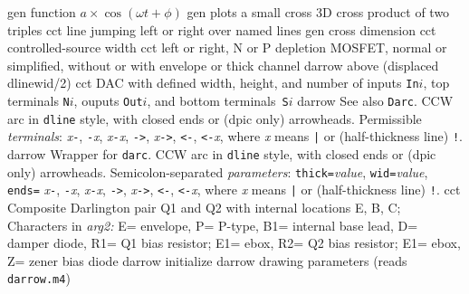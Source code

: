   {gen}
  {function $a\times\cos(\omega t + \phi)$ }
  {gen}
  {plots a small cross}
  {3D}
  {cross product of two triples}
  {cct}
  {line jumping left or right over named lines}
  {gen}
  {cross dimension}
  {cct}
  {controlled-source width}
  {cct}
  {left or right, N or P depletion MOSFET, normal or simplified,
    without or with envelope or thick channel
    }
  {darrow}
  {above (displaced dlinewid/2)}
  {cct}
  {DAC with defined width, height, and number of inputs {\tt In$i$},
    top terminals {\tt N$i$}, ouputs {\tt Out$i$},
    and bottom terminals~{\tt S$i$} }
  {darrow}
  {See also {\tt Darc}.
   CCW arc in {\tt dline} style, with closed ends or (dpic only) arrowheads.
  Permissible {\sl terminals}:
  {\sl x}{\tt -},
  {\tt -}{\sl x}, {\sl x}{\tt -}{\sl x}, {\tt ->}, {\sl x}{\tt ->},
  {\tt <-}, {\tt <-}{\sl x}, {\tt <->}
  where {\sl x} means {\tt |} or (half-thickness line) {\tt !}.}
  {darrow}
  {Wrapper for {\tt darc}.
   CCW arc in {\tt dline} style, with closed ends or (dpic only) arrowheads.
  Semicolon-separated {\sl parameters}:
  {\tt thick=}{\sl value}, {\tt wid=}{\sl value}, {\tt ends=}
  {\sl x}{\tt -},
  {\tt -}{\sl x}, {\sl x}{\tt -}{\sl x}, {\tt ->}, {\sl x}{\tt ->},
  {\tt <-}, {\tt <-}{\sl x}, {\tt <->}
  where {\sl x} means {\tt |} or (half-thickness line) {\tt !}.}
  {cct}
  {Composite Darlington pair Q1 and Q2 with internal locations E, B, C;
   Characters in {\sl arg2:}
   E= envelope,
   P= P-type,
   B1= internal base lead,
   D= damper diode,
   R1= Q1 bias resistor; E1= ebox,
   R2= Q2 bias resistor; E1= ebox,
   Z= zener bias diode 
    }
  {darrow}
  {initialize darrow drawing parameters (reads {\tt darrow.m4})}
